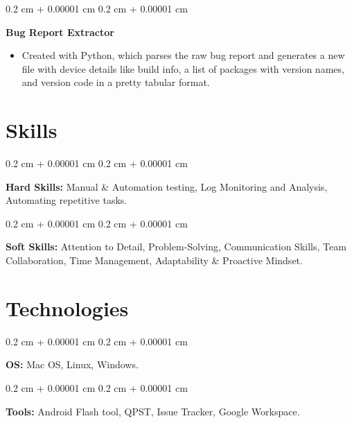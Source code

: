 \documentclass[10pt, letterpaper]{article}
\newenvironment{highlights}{
    \begin{itemize}[
        topsep=0.10 cm,
        parsep=0.10 cm,
        partopsep=0pt,
        itemsep=0pt,
        leftmargin=0.4 cm + 10pt
    ]
}{
    \end{itemize}
} %
\newenvironment{onecolentry}{
    \begin{adjustwidth}{
        0.2 cm + 0.00001 cm
    }{
        0.2 cm + 0.00001 cm
    }
}{
    \end{adjustwidth}
} %
\begin{document}
        \vspace{0.2 cm}

        \begin{onecolentry}
            \textbf{Bug Report Extractor}
            \begin{highlights}
                \item Created with Python, which parses the raw bug report and generates a new file with device details like build info, a list of packages with version names, and version code in a pretty tabular format.
            \end{highlights}
        \end{onecolentry}



    
    \section{Skills}



        
        \begin{onecolentry}
            \textbf{Hard Skills:} Manual \& Automation testing, Log Monitoring and Analysis, Automating repetitive tasks.
        \end{onecolentry}

        \vspace{0.2 cm}

        \begin{onecolentry}
            \textbf{Soft Skills:} Attention to Detail, Problem-Solving, Communication Skills, Team Collaboration, Time Management, Adaptability \& Proactive Mindset.
        \end{onecolentry}


    
    \section{Technologies}



        
        \begin{onecolentry}
            \textbf{OS:} Mac OS, Linux, Windows.
        \end{onecolentry}

        \vspace{0.2 cm}

        \begin{onecolentry}
            \textbf{Tools:} Android Flash tool, QPST, Issue Tracker, Google Workspace.
        \end{onecolentry}
\end{document}

